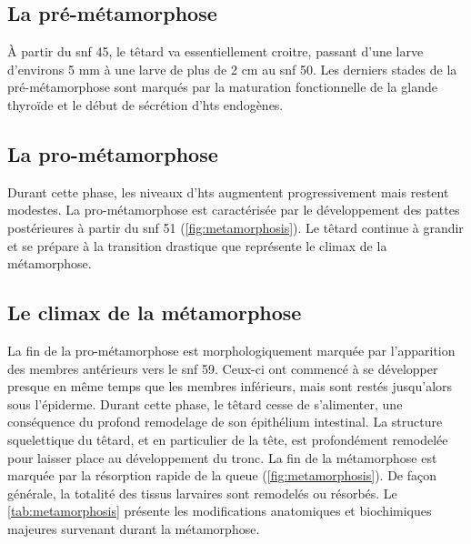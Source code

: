 \documentclass[../main.tex]{subfiles}
\begin{document}
	\subsection{La pré-métamorphose}
		À partir du \gls{snf} 45, le têtard va essentiellement croitre, passant d'une larve d'environs 5 mm à une larve de plus de 2 cm au \gls{snf} 50.
		Les derniers stades de la pré-métamorphose sont marqués par la maturation fonctionnelle de la glande thyroïde et le début de sécrétion d'\glspl{ht} endogènes.

		\subsection{La pro-métamorphose}
		Durant cette phase, les niveaux d'\glspl{ht} augmentent progressivement mais restent modestes.
		La pro-métamorphose est caractérisée par le développement des pattes postérieures à partir du \gls{snf} 51 (\autoref{fig:metamorphosis}).
		Le têtard continue à grandir et se prépare à la transition drastique que représente le climax de la métamorphose.

		

	\subsection{Le climax de la métamorphose}
		La fin de la pro-métamorphose est morphologiquement marquée par l'apparition des membres antérieurs vers le \gls{snf} 59.
		Ceux-ci ont commencé à se développer presque en même temps que les membres inférieurs, mais sont restés jusqu'alors sous l'épiderme.
		Durant cette phase, le têtard cesse de s'alimenter, une conséquence du profond remodelage de son épithélium intestinal.
		La structure squelettique du têtard, et en particulier de la tête, est profondément remodelée pour laisser place au développement du tronc.
		La fin de la métamorphose est marquée par la résorption rapide de la queue (\autoref{fig:metamorphosis}).
		De façon générale, la totalité des tissus larvaires sont remodelés ou résorbés. Le \autoref{tab:metamorphosis} présente les modifications anatomiques et biochimiques majeures survenant durant la métamorphose.

		
\end{document}

